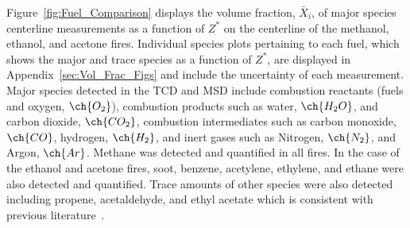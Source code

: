 \documentclass[12pt]{article}
\begin{document}
Figure~\ref{fig:Fuel_Comparison} displays the volume fraction, $\bar{X}_{i}$, of major species centerline measurements as a function of $Z^{*}$ on the centerline of the methanol, ethanol, and acetone fires. Individual species plots pertaining to each fuel, which shows the major and trace species as a function of $Z^{*}$, are displayed in Appendix~\ref{sec:Vol_Frac_Figs} and include the uncertainty of each measurement. Major species detected in the TCD and MSD include combustion reactants (fuels and oxygen, $\ch{O_2}$), combustion products such as water, $\ch{H_{2}O}$, and carbon dioxide, $\ch{CO_{2}}$, combustion intermediates such as carbon monoxide, $\ch{CO}$, hydrogen, $\ch{H_{2}}$, and inert gases such as Nitrogen, $\ch{N_{2}}$, and Argon, $\ch{Ar}$. Methane was detected and quantified in all fires. In the case of the ethanol and acetone fires, soot, benzene, acetylene, ethylene, and ethane were also detected and quantified. Trace amounts of other species were also detected including propene, acetaldehyde, and ethyl acetate which is consistent with previous literature~\cite{Pichon2009, Gong2015}.
\end{document}
